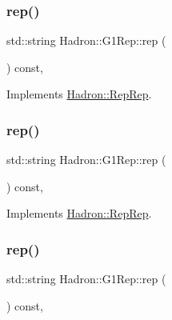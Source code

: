 \subsubsection{\texorpdfstring{rep()}{rep()}\hspace{0.1cm}{\footnotesize\ttfamily [1/5]}}
{\footnotesize\ttfamily std\+::string Hadron\+::\+G1\+Rep\+::rep (\begin{DoxyParamCaption}{ }\end{DoxyParamCaption}) const\hspace{0.3cm}{\ttfamily [inline]}, {\ttfamily [virtual]}}



Implements \mbox{\hyperlink{structHadron_1_1RepRep_ab3213025f6de249f7095892109575fde}{Hadron\+::\+Rep\+Rep}}.

\mbox{\label{structHadron_1_1G1Rep_a2da49f8741322aebd7903da15cb9b751}} 
\subsubsection{\texorpdfstring{rep()}{rep()}\hspace{0.1cm}{\footnotesize\ttfamily [2/5]}}
{\footnotesize\ttfamily std\+::string Hadron\+::\+G1\+Rep\+::rep (\begin{DoxyParamCaption}{ }\end{DoxyParamCaption}) const\hspace{0.3cm}{\ttfamily [inline]}, {\ttfamily [virtual]}}



Implements \mbox{\hyperlink{structHadron_1_1RepRep_ab3213025f6de249f7095892109575fde}{Hadron\+::\+Rep\+Rep}}.

\mbox{\label{structHadron_1_1G1Rep_a2da49f8741322aebd7903da15cb9b751}} 
\subsubsection{\texorpdfstring{rep()}{rep()}\hspace{0.1cm}{\footnotesize\ttfamily [3/5]}}
{\footnotesize\ttfamily std\+::string Hadron\+::\+G1\+Rep\+::rep (\begin{DoxyParamCaption}{ }\end{DoxyParamCaption}) const\hspace{0.3cm}{\ttfamily [inline]}, {\ttfamily [virtual]}}



